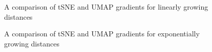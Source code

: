 \documentclass{article}
\theoremstyle{definition}
\begin{document}
\begin{figure}
\centering
	\qquad
	\caption{A comparison of tSNE and UMAP gradients for linearly growing distances}%
	\label{fig:linear_grads}%
\end{figure}

\begin{figure}
\centering
	\qquad
	\caption{A comparison of tSNE and UMAP gradients for exponentially growing distances}%
	\label{fig:exp_grads}%
\end{figure}
\end{document}
